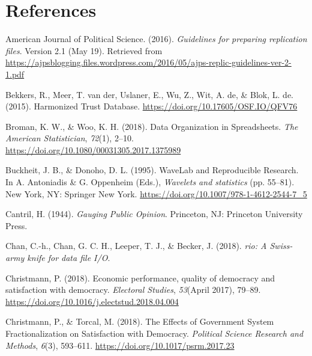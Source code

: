 \documentclass[12pt,]{article}
\begin{document}
\normalsize

\hypertarget{references}{%
\section{References}\label{references}}

\renewcommand{\baselinestretch}{1}\normalsize
\parindent 0in
\leftskip 0.2in

\parindent -0.2in

\hypertarget{refs}{}
\leavevmode\hypertarget{ref-AJPS2016}{}%
American Journal of Political Science. (2016). \emph{Guidelines for preparing replication files}. Version 2.1 (May 19). Retrieved from \url{https://ajpsblogging.files.wordpress.com/2016/05/ajps-replic-guidelines-ver-2-1.pdf}

\leavevmode\hypertarget{ref-Bekkers2015}{}%
Bekkers, R., Meer, T. van der, Uslaner, E., Wu, Z., Wit, A. de, \& Blok, L. de. (2015). Harmonized Trust Database. \url{https://doi.org/10.17605/OSF.IO/QFV76}

\leavevmode\hypertarget{ref-Broman2018}{}%
Broman, K. W., \& Woo, K. H. (2018). Data Organization in Spreadsheets. \emph{The American Statistician}, \emph{72}(1), 2--10. \url{https://doi.org/10.1080/00031305.2017.1375989}

\leavevmode\hypertarget{ref-Buckheit1995}{}%
Buckheit, J. B., \& Donoho, D. L. (1995). WaveLab and Reproducible Research. In A. Antoniadis \& G. Oppenheim (Eds.), \emph{Wavelets and statistics} (pp. 55--81). New York, NY: Springer New York. \url{https://doi.org/10.1007/978-1-4612-2544-7_5}

\leavevmode\hypertarget{ref-Cantril1944}{}%
Cantril, H. (1944). \emph{Gauging Public Opinion}. Princeton, NJ: Princeton University Press.

\leavevmode\hypertarget{ref-rio}{}%
Chan, C.-h., Chan, G. C. H., Leeper, T. J., \& Becker, J. (2018). \emph{rio: A Swiss-army knife for data file I/O}.

\leavevmode\hypertarget{ref-Christmann2018}{}%
Christmann, P. (2018). Economic performance, quality of democracy and satisfaction with democracy. \emph{Electoral Studies}, \emph{53}(April 2017), 79--89. \url{https://doi.org/10.1016/j.electstud.2018.04.004}

\leavevmode\hypertarget{ref-Christmann2018a}{}%
Christmann, P., \& Torcal, M. (2018). The Effects of Government System Fractionalization on Satisfaction with Democracy. \emph{Political Science Research and Methods}, \emph{6}(3), 593--611. \url{https://doi.org/10.1017/psrm.2017.23}
\end{document}
